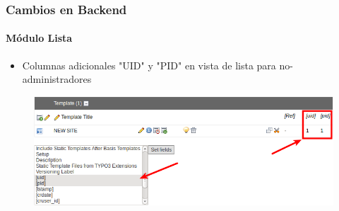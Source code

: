 
\begin{frame}[fragile]
	\frametitle{Cambios en Backend}
	\framesubtitle{Módulo Lista}

	\begin{itemize}
		\item Columnas adicionales "UID" y "PID" en vista de lista para no-administradores
	\end{itemize}

	\begin{figure}
		\includegraphics[width=0.95\linewidth]{Images/BackendChanges/AdditionalColumnsInListModule.png}
	\end{figure}

\end{frame}


